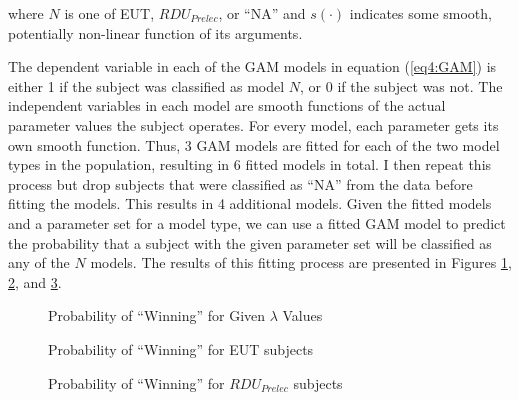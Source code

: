 \documentclass[../main.tex]{subfiles}
\begin{document}
\noindent where $N$ is one of EUT, $\mathit{RDU_{Prelec}}$, or \enquote{NA} and $s(\cdot)$ indicates some smooth, potentially non-linear function of its arguments.

The dependent variable in each of the GAM models in equation (\ref{eq4:GAM}) is either 1 if the subject was classified as model $N$, or 0 if the subject was not.
The independent variables in each model are smooth functions of the actual parameter values the subject operates.
For every model, each parameter gets its own smooth function.
Thus, 3 GAM models are fitted for each of the two model types in the population, resulting in 6 fitted models in total.
I then repeat this process but drop subjects that were classified as \enquote{NA} from the data before fitting the models.
This results in 4 additional models.
Given the fitted models and a parameter set for a model type, we can use a fitted GAM model to predict the probability that a subject with the given parameter set will be classified as any of the $N$ models.
The results of this fitting process are presented in Figures \ref{fig:HN1_win_mu}, \ref{fig:HN1_win_eut}, and \ref{fig:HN1_win_pre}.

\begin{figure}[h!]
	\center
	\caption{Probability of \enquote{Winning} for Given $\lambda$ Values}
	\label{fig:HN1_win_mu}
\end{figure}

\begin{figure}[h!]
	\center
	\caption{Probability of \enquote{Winning} for EUT subjects}
	\label{fig:HN1_win_eut}
\end{figure}

\begin{figure}[h!]
	\center
	\caption{Probability of \enquote{Winning} for $\mathit{RDU_{Prelec}}$ subjects}
	\label{fig:HN1_win_pre}
\end{figure}
\end{document}
